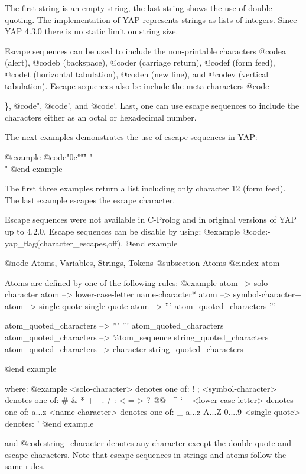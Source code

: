 {The first string is an empty string, the last string shows the use of
double-quoting. The implementation of YAP represents strings as
lists of integers. Since YAP 4.3.0 there is no static limit on string
size.

Escape sequences can be used to include the non-printable characters
@code{a} (alert), @code{b} (backspace), @code{r} (carriage return),
@code{f} (form feed), @code{t} (horizontal tabulation), @code{n} (new
line), and @code{v} (vertical tabulation). Escape sequences also be
include the meta-characters @code{\}, @code{"}, @code{'}, and
@code{`}. Last, one can use escape sequences to include the characters
either as an octal or hexadecimal number.

The next examples demonstrates the use of escape sequences in YAP:

@example
@code{"\x0c\" "\" "\f" "\\" }
@end example

The first three examples return a list including only character 12 (form
feed). The last example escapes the escape character.

Escape sequences were not available in C-Prolog and in original
versions of YAP up to 4.2.0. Escape sequences can be disable by using:
@example
@code{:- yap_flag(character_escapes,off).}
@end example


@node Atoms, Variables, Strings, Tokens
@subsection Atoms
@cindex atom

Atoms are defined by one of the following rules:
@example
   atom --> solo-character
   atom --> lower-case-letter name-character*
   atom --> symbol-character+
   atom --> single-quote  single-quote
   atom --> ''' atom_quoted_characters '''


  atom_quoted_characters --> ''' ''' atom_quoted_characters
  atom_quoted_characters --> '\' atom_sequence string_quoted_characters
  atom_quoted_characters --> character string_quoted_characters

@end example

where:
@example
   <solo-character>     denotes one of:    ! ;
   <symbol-character>   denotes one of:    # & * + - . / : < 
                                           = > ? @@ \ ^ ` ~
   <lower-case-letter>  denotes one of:    a...z
   <name-character>     denotes one of:    _ a...z A...Z 0....9
   <single-quote>       denotes:           '
@end example

and @code{string_character} denotes any character except the double quote
and escape characters. Note that escape sequences in strings and atoms
follow the same rules.

}}
